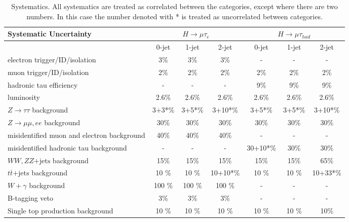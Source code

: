 \documentclass[oneside, letterpaper, oldfontcommands]{memoir}
\begin{document}
{{{\begin{table}[hbtp]
 \begin{center}
{\footnotesize
  \caption{Systematics. All systematics are treated as correlated between the categories, except where there are two numbers. In
this case the number denoted with * is treated as uncorrelated between categories.}
  \label{tab:systematics}
  \vspace{0.1in}
  \begin{tabular}{|l|c|c|c|c|c|c|} \hline
Systematic  Uncertainty                                &  \multicolumn{3}{c|}{$H \to \mu \tau_{e}$}& \multicolumn{3}{c|}{$H \to \mu \tau_{had}$}    \\ \hline
                                                       &  0-jet  & 1-jet  & 2-jet     &  0-jet    & 1-jet     & 2-jet     \\ \hline \hline
electron trigger/ID/isolation                          &   3\%   &   3\%  &   3\%     &    -      &   -       &  -        \\
muon  trigger/ID/isolation                             &   2\%   &   2\%  &   2\%     &    2\%    &  2\%      &  2\%      \\
hadronic tau efficiency                                &   -     &   -    &   -       &    9\%    &  9\%      &  9\%      \\
luminosity                                             &  2.6\%  &  2.6\% &  2.6\%    &  2.6\%    &  2.6\%    &  2.6\%    \\
$Z \to \tau \tau$ background                           &   3+3*\%&  3+5*\%&  3+10*\%  &   3+5*\%  &   3+5*\%  &   3+10*\% \\
$Z \to \mu\mu,ee$ background                           &   30\%  &  30\%  &  30\%     &   30\%    &   30\%    &   30\%    \\
misidentified muon and electron  background                      &  40\%   &  40\%  &  40\%     &    -      &   -       &   -       \\
misidentified hadronic tau  background                           &  -      &   -    &    -      &   30+10*\%&  30\%     &  30\%     \\
$WW,ZZ\mathrm{+jets}$ background                                &  15\%   &  15\%  &   15\%    &  15\%     &  15\%     &  65\%     \\
$t\overline{t}\mathrm{+jets}$ background                        &  10 \%  &  10 \% &  10+10*\% &  10 \%    &  10 \%    &  10+33*\% \\
$W +\gamma$ background                                 &  100 \% &  100 \%&  100 \%   &     -     &    -      &    -       \\
B-tagging veto                                         & 3\%     &   3\%  &   3\%     &    -      &    -      &    -       \\
Single top production background                       &  10 \%  &  10 \% &  10 \%    &  10 \%    &  10 \%    &   10\%    \\ \hline
  \end{tabular}
} %
 \end{center}
\end{table}
~               

}}}
\end{document}
